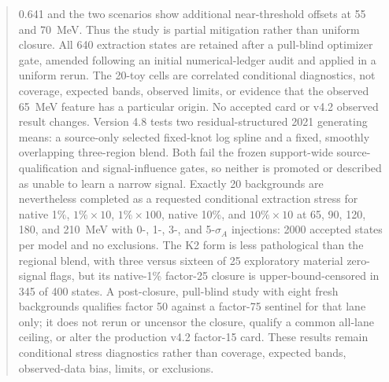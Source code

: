\documentclass[11pt]{article}
\begin{document}
\begin{abstract}
0.641 and the two scenarios show additional near-threshold offsets at 55 and
70~MeV.  Thus the study is partial mitigation rather than uniform closure.
All 640 extraction states are retained after a pull-blind optimizer gate,
amended following an initial numerical-ledger audit and applied in a uniform
rerun.  The 20-toy cells are correlated conditional diagnostics, not coverage,
expected bands, observed limits, or evidence that the observed 65~MeV feature
has a particular origin.  No accepted card or v4.2 observed result changes.
Version 4.8 tests two residual-structured 2021 generating means: a source-only
selected fixed-knot log spline and a fixed, smoothly overlapping three-region
blend.  Both fail the frozen support-wide source-qualification and
signal-influence gates, so neither is promoted or described as unable to learn
a narrow signal.  Exactly 20 backgrounds are nevertheless completed as a
requested conditional extraction stress for native 1\%, $1\%\times10$,
$1\%\times100$, native 10\%, and $10\%\times10$ at 65, 90, 120, 180, and
210~MeV with 0-, 1-, 3-, and 5-$\sigma_A$ injections: 2000 accepted states per
model and no exclusions.  The K2 form is less pathological than the regional
blend, with three versus sixteen of 25 exploratory material zero-signal flags,
but its native-1\% factor-25 closure is upper-bound-censored in 345 of 400
states.  A post-closure, pull-blind study with eight fresh backgrounds
qualifies factor 50 against a factor-75 sentinel for that lane only; it does
not rerun or uncensor the closure, qualify a common all-lane ceiling, or alter
the production v4.2 factor-15 card.  These results remain conditional stress
diagnostics rather than coverage, expected bands, observed-data bias, limits,
or exclusions.
\end{abstract}

\tableofcontents
\clearpage


\clearpage








\appendix



\clearpage




\clearpage


\end{document}
